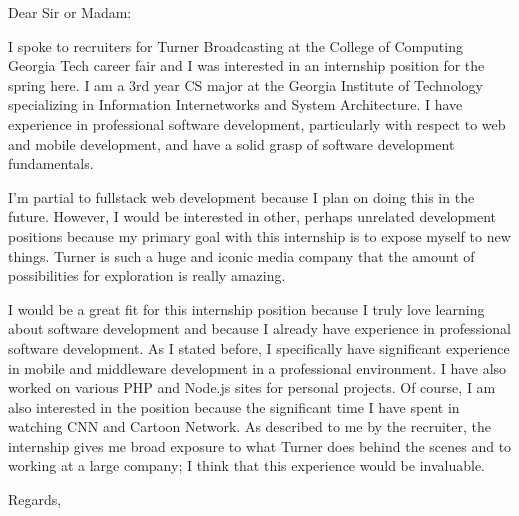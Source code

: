 \documentclass{letter}
\begin{document}
\begin{letter}{}
\opening{Dear Sir or Madam:}

I spoke to recruiters for Turner Broadcasting at the College of Computing Georgia Tech career fair and I was interested in an internship position for the spring here. I am a 3rd year CS major at the Georgia Institute of Technology specializing in Information Internetworks and System Architecture. I have experience in professional software development, particularly with respect to web and mobile development, and have a solid grasp of software development fundamentals. 

I'm partial to fullstack web development because I plan on doing this in the future. However, I would be interested in other, perhaps unrelated development positions because my primary goal with this internship is to expose myself to new things. Turner is such a huge and iconic media company that the amount of possibilities for exploration is really amazing.

I would be a great fit for this internship position because I truly love learning about software development and because I already have experience in professional software development.  As I stated before, I specifically have significant experience in mobile and middleware development in a professional environment. I have also worked on various PHP and Node.js sites for personal projects. Of course, I am also interested in the position because the significant time I have spent in watching CNN and Cartoon Network. As described to me by the recruiter, the internship gives me broad exposure to what Turner does behind the scenes and to working at a large company; I think that this experience would be invaluable.

\closing{Regards,}
\end{letter}
\end{document}
